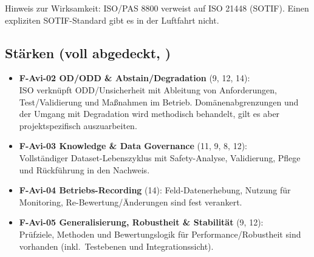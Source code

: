 \medskip
Hinweis zur Wirksamkeit: ISO/PAS 8800 verweist auf ISO 21448 (SOTIF). Einen expliziten SOTIF-Standard gibt es in der Luftfahrt nicht.

\subsection{Stärken (voll abgedeckt, \covV)}
\begin{itemize}
  \item \textbf{F-Avi-02 OD/ODD \& Abstain/Degradation} (9, 12, 14): \\
  ISO verknüpft ODD/Unsicherheit mit Ableitung von Anforderungen, Test/Validierung und Maßnahmen im Betrieb. 
  Domänenabgrenzungen und der Umgang mit Degradation wird methodisch behandelt, gilt es aber projektspezifisch auszuarbeiten.
  \item \textbf{F-Avi-03 Knowledge \& Data Governance} (11, 9, 8, 12): \\
  Vollständiger Dataset-Lebenszyklus mit Safety-Analyse, Validierung, Pflege und Rückführung in den Nachweis. 
  \item \textbf{F-Avi-04 Betriebs-Recording} (14): Feld-Datenerhebung, Nutzung für Monitoring, Re-Bewertung/Änderungen sind fest verankert.
  \item \textbf{F-Avi-05 Generalisierung, Robustheit \& Stabilität} (9, 12): \\
  Prüfziele, Methoden und Bewertungslogik für Performance/Robustheit sind vorhanden (inkl.\ Testebenen und Integrationssicht).
\end{itemize}

